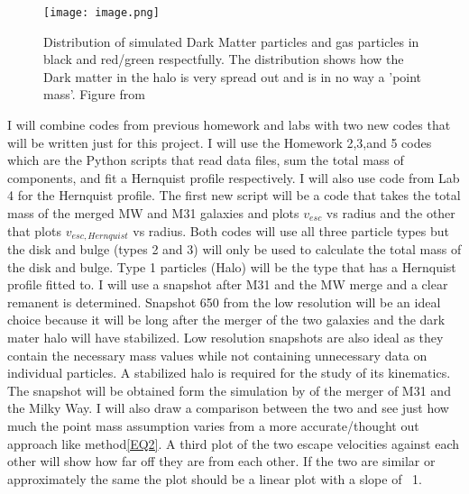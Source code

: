 \documentclass[fleqn,usenatbib]{mnras}
\begin{document}
\begin{figure}
	\texttt{[image: image.png]}
    \caption{Distribution of simulated Dark Matter particles and gas particles in black and red/green respectfully. The distribution shows how the Dark matter in the halo is very spread out and is in no way a 'point mass'. Figure from \cite{Abadi2010MNRAS} }
    \label{fig:fig 2}
\end{figure}
I will combine codes from previous homework and labs with two new codes that will be written just for this project. I will use the Homework 2,3,and 5 codes which are the Python scripts that read data files, sum the total mass of components, and fit a Hernquist profile respectively. I will also use code from Lab 4 for the Hernquist profile. The first new script will be a code that takes the total mass of the merged MW and M31 galaxies and plots $v_{esc}$ vs radius and the other that plots $v_{esc,Hernquist}$ vs radius. Both codes will use all three particle types but the disk and bulge (types 2 and 3) will only be used to calculate the total mass of the disk and bulge. Type 1 particles (Halo) will be the type that has a Hernquist profile fitted to. I will use a snapshot after M31 and the MW merge and a clear remanent is determined. Snapshot 650 from the low resolution will be an ideal choice because it will be long after the merger of the two galaxies and the dark mater halo will have stabilized. Low resolution snapshots are also ideal as they contain the necessary mass values while not containing unnecessary data on individual particles. A stabilized halo is required for the study of its kinematics. The snapshot will be obtained form the simulation by \citep[][]{vanderMarel2012ApJ} of the merger of M31 and the Milky Way. 
I will also draw a comparison between the two and see just how much the point mass assumption varies from a more accurate/thought out approach like method\ref{EQ2}. A third plot of the two escape velocities against each other will show how far off they are from each other. If the two are similar or approximately the same the plot should be a linear plot with a slope of ~1.   
\end{document}
